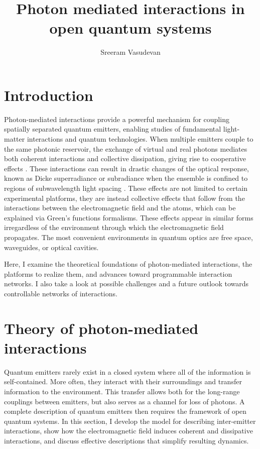 \documentclass{article}
\title{Photon mediated interactions in open quantum systems}
\author{Sreeram Vasudevan}
\date{}
\begin{document}
\maketitle
\newpage
\tableofcontents

\doublespacing

\section{Introduction}

Photon-mediated interactions provide a powerful mechanism for coupling spatially
separated quantum emitters, enabling studies of fundamental light-matter interactions
and quantum technologies. When multiple emitters couple to the same photonic
reservoir, the exchange of virtual and real photons mediates both coherent
interactions and collective dissipation, giving rise to cooperative effects \cite{svidzinsky_cooperative_2010}. These interactions can result in drastic changes of the optical
response, known as Dicke superradiance or subradiance when the
ensemble is confined to regions of subwavelength light spacing \cite{dicke_coherence_1954,gross_superradiance_1982}. These effects are not limited to certain experimental platforms, they
are instead collective effects that follow from the interactions between the
electromagnetic field and the atoms, which can be explained via Green's functions
formalisms. These effects appear in similar forms irregardless of the environment
through which the electromagnetic field propagates. The most convenient
environments in quantum optics are free space, waveguides, or optical cavities.

Here, I examine the theoretical foundations of photon-mediated interactions, the
platforms to realize them, and advances toward programmable interaction networks. I
also take a look at possible challenges and a future outlook towards controllable
networks of interactions.

\section{Theory of photon-mediated interactions}

Quantum emitters rarely exist in a closed system where all of the information is
self-contained. More often, they interact with their surroundings and transfer
information to the environment. This transfer allows both for the long-range couplings
between emitters, but also serves as a channel for loss of photons. A complete
description of quantum emitters then requires the framework of open quantum systems.
In this section, I develop the model for describing inter-emitter interactions, show
how the electromagnetic field induces coherent and dissipative interactions, and
discuss effective descriptions that simplify resulting dynamics.
\end{document}
